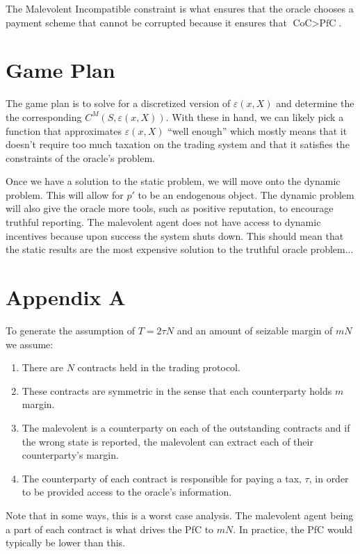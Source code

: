 \documentclass[12pt]{article}
\begin{document}
  The Malevolent Incompatible constraint is what ensures that the oracle chooses a payment scheme
  that cannot be corrupted because it ensures that $\text{CoC} > \text{PfC}$.


\section{Game Plan}

  The game plan is to solve for a discretized version of $\varepsilon(x, X)$ and determine the the
  corresponding $C^M(S, \varepsilon(x, X))$. With these in hand, we can likely pick a function that
  approximates $\varepsilon(x, X)$ ``well enough'' which mostly means that it doesn't require too
  much taxation on the trading system and that it satisfies the constraints of the oracle's problem.

  Once we have a solution to the static problem, we will move onto the dynamic problem. This will
  allow for $p'$ to be an endogenous object. The dynamic problem will also give the oracle more
  tools, such as positive reputation, to encourage truthful reporting. The malevolent agent does not
  have access to dynamic incentives because upon success the system shuts down. This should mean
  that the static results are the most expensive solution to the truthful oracle problem...

  
\section{Appendix A}

  To generate the assumption of $T = 2 \tau N$ and an amount of seizable margin of $mN$ we assume:

  \begin{enumerate}
    \item There are $N$ contracts held in the trading protocol.
    \item These contracts are symmetric in the sense that each counterparty holds $m$ margin.
    \item The malevolent is a counterparty on each of the outstanding contracts and if the wrong
    state is reported, the malevolent can extract each of their counterparty's margin.
    \item The counterparty of each contract is responsible for paying a tax, $\tau$, in order to
    be provided access to the oracle's information.
  \end{enumerate}

  Note that in some ways, this is a worst case analysis. The malevolent agent being a part of each
  contract is what drives the PfC to $mN$. In practice, the PfC would typically be lower than this.
\end{document}

